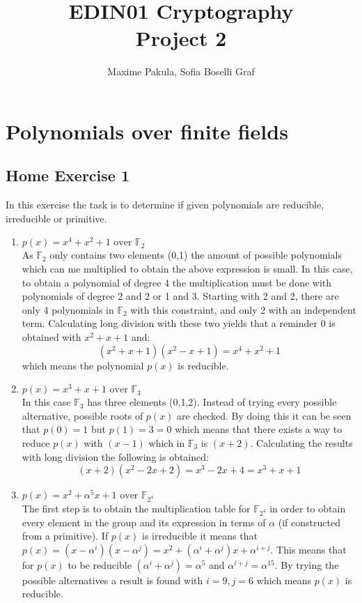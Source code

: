 \documentclass{article}
\title{EDIN01 Cryptography \\ Project 2}
\author{Maxime Pakula, Sofia Boselli Graf}
\begin{document}
\maketitle

\tableofcontents

\newpage


\section{Polynomials over finite fields}

\subsection{Home Exercise 1}
In this exercise the task is to determine if given polynomials are reducible, irreducible or primitive. 

\begin{enumerate}
    \item $p(x) = x^4 + x^2 + 1 \text{ over } \mathbb F_2$ \\
    As $\mathbb F_2$ only contains two elements (0,1) the amount of possible polynomials which can me multiplied to obtain the above expression is small. In this case, to obtain a polynomial of degree 4 the multiplication must be done with polynomials of degree 2 and 2 or 1 and 3. Starting with 2 and 2, there are only 4 polynomials in $\mathbb F_2$ with this constraint, and only 2 with an independent term. Calculating long division with these two yields that a reminder 0 is obtained with $x^2 + x + 1$ and:
    $$(x^2+x+1)(x^2-x+1) = x^4 + x^2 + 1$$
    which means the polynomial $p(x)$ is reducible.
    \item $p(x) = x^3 + x + 1 \text{ over } \mathbb F_3$ \\
    In this case $\mathbb F_3$ has three elements (0,1,2). Instead of trying every possible alternative, possible roots of $p(x)$ are checked. By doing this it can be seen that $p(0) = 1$ but $p(1) = 3 = 0$ which means that there exists a way to reduce $p(x)$ with $(x-1)$ which in $\mathbb F_3$ is $(x+2)$. Calculating the results with long division the following is obtained:
    $$(x+2)(x^2-2x+2) = x^3 - 2x + 4 = x^3 + x + 1$$
    \item  $p(x) = x^2 + \alpha^5 x + 1 \text{ over } \mathbb F_{2^4}$ \\
    The first step is to obtain the multiplication table for $\mathbb F_{2^4}$ in order to obtain every element in the group and its expression in terms of $\alpha$ (if constructed from a primitive). If $p(x)$ is irreducible it means that $p(x) = (x-\alpha^i)(x-\alpha^j) = x^2 + (\alpha^i + \alpha^j)x + \alpha^{i+j}$. This means that for $p(x)$ to be reducible $(\alpha^i + \alpha^j) = \alpha^5$ and  $\alpha^{i+j} = \alpha^{15}$. By trying the possible alternatives a result is found with $i = 9, j=6$ which means $p(x)$ is reducible.
\end{enumerate} 
\end{document}
